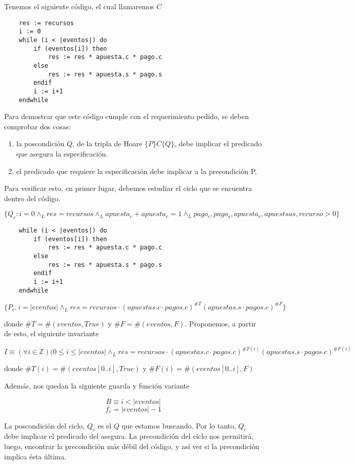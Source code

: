 \documentclass[../document.tex]{subfiles}
\begin{document}
Tenemos el siguiente código, el cual llamaremos $C$
\begin{verbatim}
    res := recursos
    i := 0
    while (i < |eventos|) do
        if (eventos[i]) then
            res := res * apuesta.c * pago.c
        else
            res := res * apuesta.s * pago.s
        endif
        i := i+1
    endwhile
\end{verbatim}

Para demostrar que este código cumple con el requerimiento pedido, se deben comprobar dos cosas:

\begin{enumerate}
    \item la poscondición $Q$, de la tripla de Hoare $\{P\}C\{Q\}$, debe implicar el predicado que asegura la especificación.
    \item el predicado que requiere la especificación debe implicar a la precondición {P}.
\end{enumerate}

Para verificar esto, en primer lugar, debemos estudiar el ciclo que se encuentra dentro del código.

$\{Q_c: i = 0 \land_{L} res = recursos \land_{L} apuesta_{c}+apuesta_{c}=1 \land_{L} pago_{c},pago_{s},apuesta_{c},apuestsa{s},recurso>0\}$
\begin{verbatim}
    while (i < |eventos|) do
        if (eventos[i]) then
            res := res * apuesta.c * pago.c
        else
            res := res * apuesta.s * pago.s
        endif
        i := i+1
    endwhile
\end{verbatim}
$\{P_c: i = |eventos| \land_{L} res = recursos \cdot (apuestas.c\cdot pagos.c)^{\#T}(apuestas.s\cdot pagos.c)^{\#F}\}$

donde $\#T = \#(eventos, True)$ y $\#F = \#(eventos, F)$. Proponemos, a partir de esto, el siguiente invariante

$$I \equiv (\forall i \in \mathbb{Z})(0\leq i \leq |eventos| \land_L res = recursos \cdot (apuestas.c\cdot pagos.c)^{\#T(i)}(apuestas.s\cdot pagos.c)^{\#F(i)}$$

donde $\#T(i) = \#(eventos[0..i], True)$ y $\#F(i) = \#(eventos[0..i], F)$

Además, nos quedan la siguiente guarda y función variante

$$B \equiv i < |eventos|$$
$$f_v = |eventos|-1$$

La poscondición del ciclo, $Q_c$ es el $Q$ que estamos buscando. Por lo tanto, $Q_c$ debe implicar el predicado del asegura. La precondición del ciclo nos permitirá, luego, encontrar la precondición más débil del código, y así ver si la precondición implica ésta última.
\end{document}

